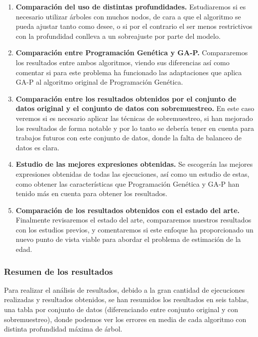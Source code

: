 \begin{enumerate}
	\item \textbf{Comparación del uso de distintas profundidades.} Estudiaremos si es necesario utilizar árboles con muchos nodos, de cara a que el algoritmo se pueda ajustar tanto como desee, o si por el contrario el ser menos restrictivos con la profundidad conlleva a un sobreajuste por parte del modelo.
	\item \textbf{Comparación entre Programación Genética y GA-P.} Compararemos los resultados entre ambos algoritmos, viendo sus diferencias así como comentar si para este problema ha funcionado las adaptaciones que aplica GA-P al algoritmo original de Programación Genética.
	\item \textbf{Comparación entre los resultados obtenidos por el conjunto de datos original y el conjunto de datos con sobremuestreo.} En este caso veremos si es necesario aplicar las técnicas de sobremuestreo, si han mejorado los resultados de forma notable y por lo tanto se debería tener en cuenta para trabajos futuros con este conjunto de datos, donde la falta de balanceo de datos es clara.
	\item \textbf{Estudio de las mejores expresiones obtenidas.} Se escogerán las mejores expresiones obtenidas de todas las ejecuciones, así como un estudio de estas, como obtener las características que Programación Genética y GA-P han tenido más en cuenta para obtener los resultados.
	\item \textbf{Comparación de los resultados obtenidos con el estado del arte.} Finalmente revisaremos el estado del arte, compararemos nuestros resultados con los estudios previos, y comentaremos si este enfoque ha proporcionado un nuevo punto de vista viable para abordar el problema de estimación de la edad.
\end{enumerate}


\subsubsection{Resumen de los resultados}

Para realizar el análisis de resultados, debido a la gran cantidad de ejecuciones realizadas y resultados obtenidos, se han resumidos los resultados en seis tablas, una tabla por conjunto de datos (diferenciando entre conjunto original y con sobremuestreo), donde podemos ver los errores en media de cada algoritmo con distinta profundidad máxima de árbol.

